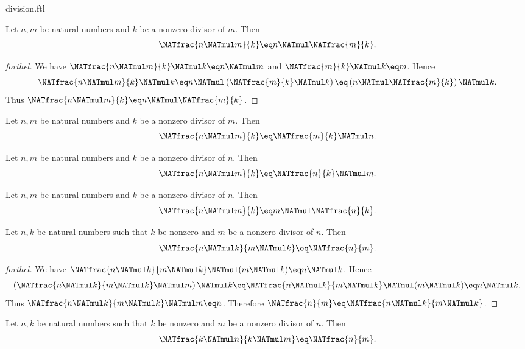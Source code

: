 \documentclass{naproche-library}
\begin{document}
\begin{smodule}[title=Division]{division.ftl}
\begin{proposition}[forthel,id=ARITHMETIC_14_1203565412058488]
  Let $n, m$ be natural numbers and $k$ be a nonzero divisor of $m$.
  Then \[\NATfrac{n \NATmul m}{k} \eq n \NATmul \NATfrac{m}{k}.\]
\end{proposition}
\begin{proof}[forthel]
  We have $\NATfrac{n \NATmul m}{k} \NATmul k \eq n \NATmul m$ and $\NATfrac{m}{k} \NATmul k \eq m$.
  Hence
  \[  \NATfrac{n \NATmul m}{k} \NATmul k
      \eq n \NATmul \left( \NATfrac{m}{k} \NATmul k \right)
      \eq \left( n \NATmul \NATfrac{m}{k} \right) \NATmul k. \]
  Thus $\NATfrac{n \NATmul m}{k} \eq n \NATmul \NATfrac{m}{k}$.
\end{proof}

\begin{corollary}[forthel,id=ARITHMETIC_14_7985412544563256]
  Let $n, m$ be natural numbers and $k$ be a nonzero divisor of $m$.
  Then \[\NATfrac{n \NATmul m}{k} \eq \NATfrac{m}{k} \NATmul n.\]
\end{corollary}

\begin{corollary}[forthel,id=ARITHMETIC_14_5446124202158602]
  Let $n, m$ be natural numbers and $k$ be a nonzero divisor of $n$.
  Then \[\NATfrac{n \NATmul m}{k} \eq \NATfrac{n}{k} \NATmul m.\]
\end{corollary}

\begin{corollary}[forthel,id=ARITHMETIC_14_7751120023654896]
  Let $n, m$ be natural numbers and $k$ be a nonzero divisor of $n$.
  Then \[\NATfrac{n \NATmul m}{k} \eq m \NATmul \NATfrac{n}{k}.\]
\end{corollary}

\begin{proposition}[forthel,id=ARITHMETIC_14_0531254868745988]
  Let $n, k$ be natural numbers such that $k$ be nonzero and $m$ be a nonzero divisor of $n$.
  Then \[\NATfrac{n \NATmul k}{m \NATmul k} \eq \NATfrac{n}{m}.\]
\end{proposition}
\begin{proof}[forthel]
  We have $\NATfrac{n \NATmul k}{m \NATmul k} \NATmul (m \NATmul k) \eq n \NATmul k$.
  Hence
  \[  \left( \NATfrac{n \NATmul k}{m \NATmul k} \NATmul m \right) \NATmul k
      \eq \NATfrac{n \NATmul k}{m \NATmul k} \NATmul (m \NATmul k)
      \eq n \NATmul k. \]
  Thus $\NATfrac{n \NATmul k}{m \NATmul k} \NATmul m \eq n$.
  Therefore $\NATfrac{n}{m} \eq \NATfrac{n \NATmul k}{m \NATmul k}$.
\end{proof}

\begin{corollary}[forthel,id=ARITHMETIC_14_7954254458622034]
  Let $n, k$ be natural numbers such that $k$ be nonzero and $m$ be a nonzero divisor of $n$.
  Then \[\NATfrac{k \NATmul n}{k \NATmul m} \eq \NATfrac{n}{m}.\]
\end{corollary}
\end{smodule}
\end{document}
